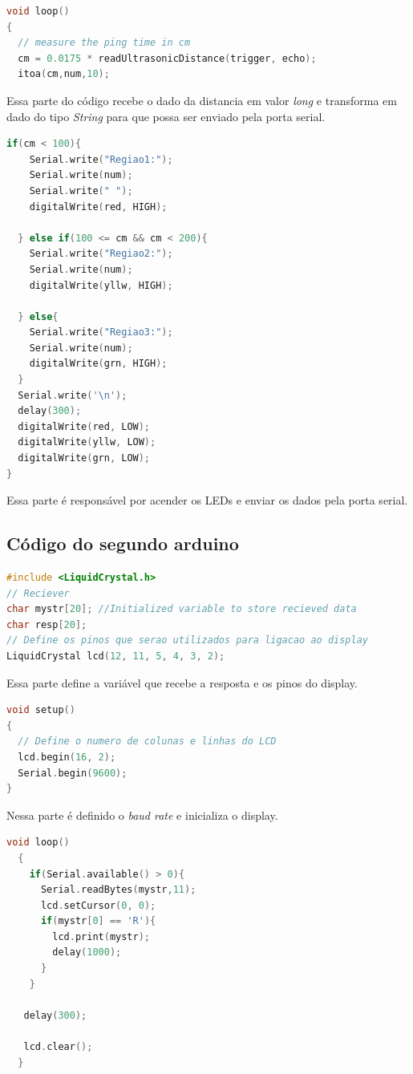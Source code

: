 \documentclass[conference]{IEEEtran}
\begin{document}
\begin{lstlisting}[language=C]
void loop()
{
  // measure the ping time in cm
  cm = 0.0175 * readUltrasonicDistance(trigger, echo);
  itoa(cm,num,10);
\end{lstlisting}

Essa parte do código recebe o dado da distancia em valor \textit{long} e transforma em dado do tipo \textit{String} para que possa ser enviado pela porta serial.

\begin{lstlisting}[language=C]
  if(cm < 100){
    Serial.write("Regiao1:");
    Serial.write(num);
    Serial.write(" ");
    digitalWrite(red, HIGH);
    
  } else if(100 <= cm && cm < 200){
    Serial.write("Regiao2:");
    Serial.write(num);
    digitalWrite(yllw, HIGH);
    
  } else{
    Serial.write("Regiao3:");
    Serial.write(num);
    digitalWrite(grn, HIGH);
  }
  Serial.write('\n');
  delay(300);
  digitalWrite(red, LOW);
  digitalWrite(yllw, LOW);
  digitalWrite(grn, LOW);
}
\end{lstlisting}

Essa parte é responsável por acender os LEDs e enviar os dados pela porta serial.

\subsection{Código do segundo arduino}

\begin{lstlisting}[language=C]
#include <LiquidCrystal.h>
// Reciever
char mystr[20]; //Initialized variable to store recieved data
char resp[20];
// Define os pinos que serao utilizados para ligacao ao display
LiquidCrystal lcd(12, 11, 5, 4, 3, 2);
\end{lstlisting}

Essa parte define a variável que recebe a resposta e os pinos do display.


\begin{lstlisting}[language=C]
void setup()
{
  // Define o numero de colunas e linhas do LCD
  lcd.begin(16, 2);
  Serial.begin(9600);
}
\end{lstlisting}

Nessa parte é definido o \textit{baud rate} e inicializa o display.

\begin{lstlisting}[language=C]
  void loop()
  {
    if(Serial.available() > 0){
      Serial.readBytes(mystr,11);
      lcd.setCursor(0, 0);
      if(mystr[0] == 'R'){
        lcd.print(mystr);
        delay(1000);
      }
    }
   
   delay(300);
   
   lcd.clear();
  }
\end{lstlisting}
\end{document}
